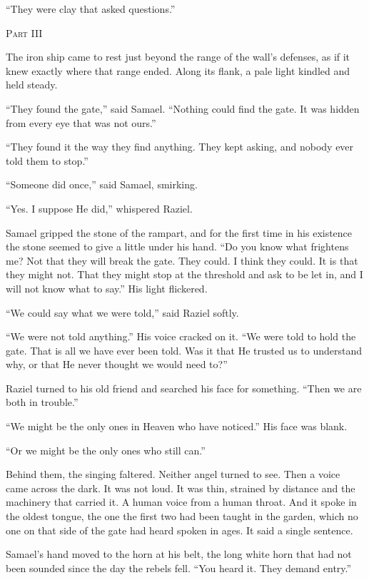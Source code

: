 \documentclass[11pt]{article}
\newcommand{\storypart}[1]{%
\clearpage
\vspace*{3\baselineskip}
\begin{center}
{\Large\scshape #1\par}
\end{center}
\vspace{2\baselineskip}
}
\begin{document}
``They were clay that asked questions.''

\storypart{Part III}

The iron ship came to rest just beyond the range of the wall's defenses, as if it knew exactly where that range ended. Along its flank, a pale light kindled and held steady.

``They found the gate,'' said Samael. ``Nothing could find the gate. It was hidden from every eye that was not ours.''

``They found it the way they find anything. They kept asking, and nobody ever told them to stop.''

``Someone did once,'' said Samael, smirking.

``Yes. I suppose He did,'' whispered Raziel.

Samael gripped the stone of the rampart, and for the first time in his existence the stone seemed to give a little under his hand. ``Do you know what frightens me? Not that they will break the gate. They could. I think they could. It is that they might not. That they might stop at the threshold and ask to be let in, and I will not know what to say.'' His light flickered.

``We could say what we were told,'' said Raziel softly.

``We were not told anything.'' His voice cracked on it. ``We were told to hold the gate. That is all we have ever been told. Was it that He trusted us to understand why, or that He never thought we would need to?''

Raziel turned to his old friend and searched his face for something. ``Then we are both in trouble.''

``We might be the only ones in Heaven who have noticed.'' His face was blank.

``Or we might be the only ones who still can.''

Behind them, the singing faltered. Neither angel turned to see.
Then a voice came across the dark. It was not loud. It was thin, strained by distance and the machinery that carried it. A human voice from a human throat. And it spoke in the oldest tongue, the one the first two had been taught in the garden, which no one on that side of the gate had heard spoken in ages. It said a single sentence.

Samael's hand moved to the horn at his belt, the long white horn that had not been sounded since the day the rebels fell. ``You heard it. They demand entry.''
\end{document}
